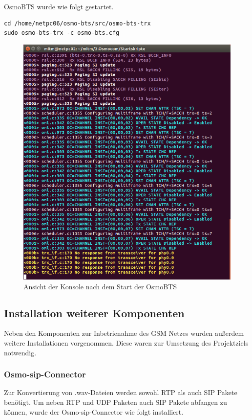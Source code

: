 \newpage
OsmoBTS wurde wie folgt gestartet.

\begin{lstlisting}
cd /home/netpc06/osmo-bts/src/osmo-bts-trx
sudo osmo-bts-trx -c osmo-bts.cfg
\end{lstlisting}

\begin{figure}[h] %
\centering
\includegraphics[width=15cm]{includes/Start_OsmoBTS}
\caption{Ansicht der Konsole nach dem Start der OsmoBTS}
\label{fig:OsmoBTS}
\end{figure}


\subsection{Installation weiterer Komponenten}
Neben den Komponenten zur Inbetrienahme des GSM Netzes wurden außerdem weitere Installationen vorgenommen. Diese waren zur Umsetzung des Projektziels notwendig.

\subsubsection{Osmo-sip-Connector}
Zur Konvertierung von .wav-Dateien werden sowohl RTP als auch SIP Pakete benötigt. Um neben RTP und UDP Paketen auch SIP Pakete abfangen zu können, wurde der Osmo-sip-Connector wie folgt installiert.

